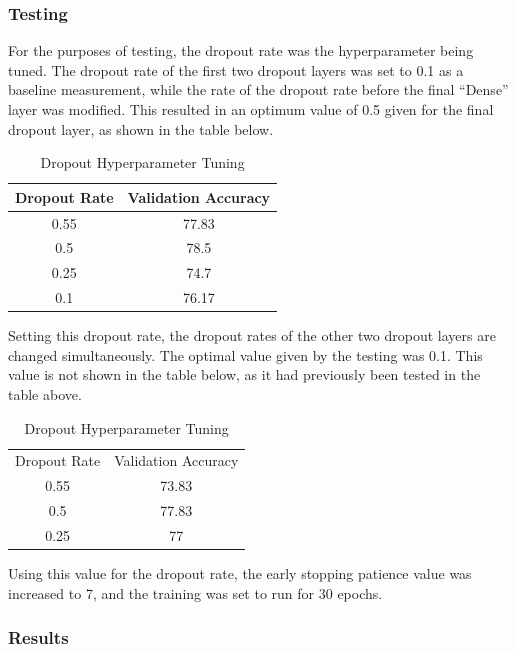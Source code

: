 \subsubsection{Testing}

For the purposes of testing, the dropout rate was the hyperparameter being
tuned. The dropout rate of the first two dropout layers was set to 0.1 as a
baseline measurement, while the rate of the dropout rate before the final
``Dense'' layer was modified. This resulted in an optimum value of 0.5 given for
the final dropout layer, as shown in the table below.

\begin{table}[H]
	\centering
	\caption{Dropout Hyperparameter Tuning}
	\label{tab:d1hyp}
	\begin{tabular}{|c|c|}
	\hline
	Dropout Rate & Validation Accuracy \\
	\hline
	0.55 & 77.83\\
	0.5 & 78.5 \\
	0.25 & 74.7 \\
	0.1 & 76.17 \\
	\hline
	\end{tabular}
\end{table}

Setting this dropout rate, the dropout rates of the other two dropout layers are
changed simultaneously. The optimal value given by the testing was 0.1. This
value is not shown in the table below, as it had previously been tested in the
table above.

\begin{table}[H]
	\centering
	\caption{Dropout Hyperparameter Tuning}
	\label{tab:d2hyp}
	\begin{tabular}{|c|c|}
	\hline
	Dropout Rate & Validation Accuracy \\
	0.55 & 73.83 \\
	0.5 & 77.83\\
	0.25 & 77 \\
	\hline
	\hline
	\end{tabular}
\end{table}

Using this value for the dropout rate, the early stopping patience value was
increased to 7, and the training was set to run for 30 epochs.

\subsubsection{Results}

